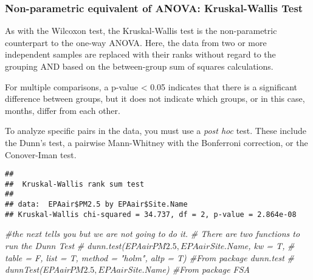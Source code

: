 \documentclass[]{article}
\newenvironment{Shaded}{\begin{snugshade}}{\end{snugshade}}
\newcommand{\KeywordTok}[1]{\textcolor[rgb]{0.13,0.29,0.53}{\textbf{#1}}}
\newcommand{\DecValTok}[1]{\textcolor[rgb]{0.00,0.00,0.81}{#1}}
\newcommand{\FloatTok}[1]{\textcolor[rgb]{0.00,0.00,0.81}{#1}}
\newcommand{\StringTok}[1]{\textcolor[rgb]{0.31,0.60,0.02}{#1}}
\newcommand{\CommentTok}[1]{\textcolor[rgb]{0.56,0.35,0.01}{\textit{#1}}}
\newcommand{\OperatorTok}[1]{\textcolor[rgb]{0.81,0.36,0.00}{\textbf{#1}}}
\newcommand{\NormalTok}[1]{#1}
\begin{document}
\subsubsection{Non-parametric equivalent of ANOVA: Kruskal-Wallis
Test}\label{non-parametric-equivalent-of-anova-kruskal-wallis-test}

As with the Wilcoxon test, the Kruskal-Wallis test is the non-parametric
counterpart to the one-way ANOVA. Here, the data from two or more
independent samples are replaced with their ranks without regard to the
grouping AND based on the between-group sum of squares calculations.

For multiple comparisons, a p-value \textless{} 0.05 indicates that
there is a significant difference between groups, but it does not
indicate which groups, or in this case, months, differ from each other.

To analyze specific pairs in the data, you must use a \emph{post hoc}
test. These include the Dunn's test, a pairwise Mann-Whitney with the
Bonferroni correction, or the Conover-Iman test.

\begin{Shaded}
\end{Shaded}

\begin{verbatim}
## 
##  Kruskal-Wallis rank sum test
## 
## data:  EPAair$PM2.5 by EPAair$Site.Name
## Kruskal-Wallis chi-squared = 34.737, df = 2, p-value = 2.864e-08
\end{verbatim}

\begin{Shaded}
\begin{Highlighting}[]
\CommentTok{#the next tells you but we are not going to do it.}
\CommentTok{# There are two functions to run the Dunn Test}
\CommentTok{# dunn.test(EPAair$PM2.5, EPAair$Site.Name, kw = T, }
\CommentTok{#           table = F, list = T, method = "holm", altp = T)   #From package dunn.test}
\CommentTok{# dunnTest(EPAair$PM2.5, EPAair$Site.Name)                    #From package FSA}
\end{Highlighting}
\end{Shaded}
\end{document}

